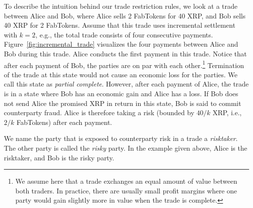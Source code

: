 To describe the intuition behind our trade restriction rules, we look at a trade between Alice and Bob, where Alice sells 2 FabTokens for 40 XRP, and Bob sells 40 XRP for 2 FabTokens.
Assume that this trade uses incremental settlement with $ k = 2 $, e.g., the total trade consists of four consecutive payments.
Figure~\ref{fig:incremental_trade} visualizes the four payments between Alice and Bob during this trade.
Alice conducts the first payment in this trade.
Notice that after each payment of Bob, the parties are on par with each other.\footnote{We assume here that a trade exchanges an equal amount of value between both traders. In practice, there are usually small profit margins where one party would gain slightly more in value when the trade is complete.} 
Termination of the trade at this state would not cause an economic loss for the parties.
We call this state as \emph{partial complete}.
However, after each payment of Alice, the trade is in a state where Bob has an economic gain and Alice has a loss.
If Bob does not send Alice the promised XRP in return in this state, Bob is said to commit counterparty fraud.
Alice is therefore taking a risk (bounded by $ 40/k $ XRP, i.e.,\ $ 2/k $ FabTokens) after each payment.


We name the party that is exposed to counterparty risk in a trade a \emph{risktaker}.
The other party is called the \emph{risky} party.
In the example given above, Alice is the risktaker, and Bob is the risky party.

